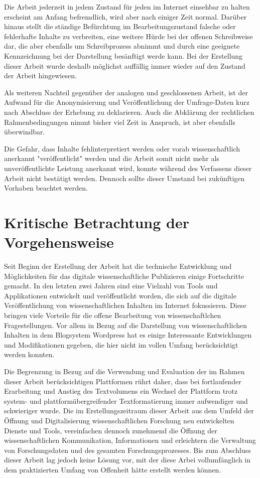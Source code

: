 Die Arbeit jederzeit in jedem Zustand für jeden im Internet einsehbar zu halten erscheint am Anfang befremdlich, wird aber nach einiger Zeit normal. Darüber hinaus stellt die ständige Befürchtung im Bearbeitungszustand falsche oder fehlerhafte Inhalte zu verbreiten, eine weitere Hürde bei der offenen Schreibweise dar, die aber ebenfalls um Schreibprozess abnimmt und durch eine geeignete Kennzeichnung bei der Darstellung besänftigt werde kann. Bei der Erstellung dieser Arbeit wurde deshalb möglichst auffällig immer wieder auf den Zustand der Arbeit hingewiesen.

Als weiteren Nachteil gegenüber der analogen und geschlossenen Arbeit, ist der Aufwand für die Anonymisierung und Veröffentlichung der Umfrage-Daten kurz nach Abschluss der Erhebung zu deklarieren. Auch die Abklärung der rechtlichen Rahmenbedingungen nimmt bisher viel Zeit in Anspruch, ist aber ebenfalls überwindbar.

Die Gefahr, dass Inhalte fehlinterpretiert werden oder vorab wissenschaftlich anerkannt "veröffentlicht" werden und die Arbeit somit nicht mehr als unveröffentlichte Leistung anerkannt wird, konnte während des Verfassens dieser Arbeit nicht bestätigt werden. Dennoch sollte dieser Umstand bei zukünftigen Vorhaben beachtet werden.

\section{Kritische Betrachtung der Vorgehensweise}

Seit Beginn der Erstellung der Arbeit hat die technische Entwicklung und Möglichkeiten für das digitale wissenschaftliche Publizieren einige Fortschritte gemacht. In den letzten zwei Jahren sind eine Vielzahl von Tools und Applikationen entwickelt und veröffentlicht worden, die sich auf die digitale Veröffentlichung von wissenschaftlichen Inhalten im Internet fokussieren. Diese bringen viele Vorteile für die offene Bearbeitung von wissenschaftlchen Fragestellungen. Vor allem in Bezug auf die Darstellung von wissenschaftlichen Inhalten in dem Blogsystem Wordpress hat es einige Interessante Entwicklungen und Modifikationen gegeben, die hier nicht im vollen Umfang berücksichtigt werden konnten.

Die Begrenzung in Bezug auf die Verwendung und Evaluation der im Rahmen dieser Arbeit berücksichtigen Plattformen rührt daher, dass bei fortlaufender Erarbeitung und Anstieg des Textvolumens ein Wechsel der Plattform trotz system- und plattformübergreifender Textformatierung immer aufwendiger und schwieriger wurde. Die im Erstellungszeitraum dieser Arbeit aus dem Umfeld der Öffnung und Digitalisierung wissenschaftlichen Forschung neu entwickelten Dienste und Tools, vereinfachen dennoch zunehmend die Öffnung der wissenschaftlichen Kommunikation, Informationen und erleichtern die Verwaltung von Forschungsdaten und des gesamten Forschungsprozesses. Bis zum Abschluss dieser Arbeit lag jedoch keine Lösung vor, mit der diese Arbei vollumfänglich in dem praktizierten Umfang von Offenheit hätte erstellt werden können.

